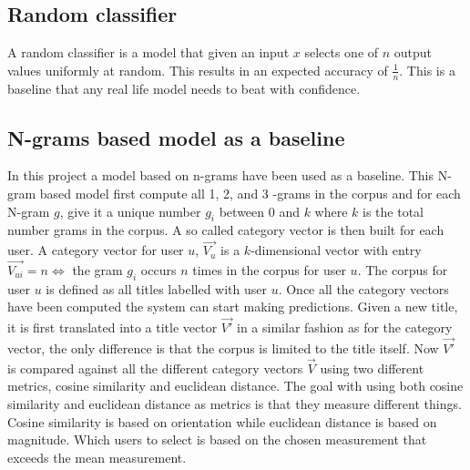 \subsection{Random classifier}
A random classifier is a model that given an input $x$ selects one of $n$ output values uniformly at random. This results in an expected accuracy of $\frac{1}{n}$. This is a baseline that any real life model needs to beat with confidence.

\subsection{N-grams based model as a baseline}
In this project a model based on n-grams \parencite{cavnar1994n} have been used as a baseline. This N-gram based model first compute  all 1, 2, and 3 -grams in the corpus and for each N-gram $g$, give it a unique number $g_i$ between $0$ and $k$ where $k$ is the total number grams in the corpus. A so called category vector is then built for each user. A category vector for user $u$, $\vec{V_u}$ is a $k$-dimensional vector with entry $\vec{V_{ui}} = n \iff $ the gram $g_i$ occurs $n$ times in the corpus for user $u$. The corpus for user $u$ is defined as all titles labelled with user $u$. Once all the category vectors have been computed the system can start making predictions. Given a new title, it is first translated into a title vector $\vec{V'}$ in a similar fashion as for the category vector, the only difference is that the corpus is limited to the title itself. Now $\vec{V'}$ is compared against all the different category vectors $\vec{V}$ using two different metrics, cosine similarity \parencite{steinbach2000comparison} and euclidean distance. The goal with using both cosine similarity and euclidean distance as metrics is that they measure different things. Cosine similarity is based on orientation while euclidean distance is based on magnitude. Which users to select is based on the chosen measurement that exceeds the mean measurement.

